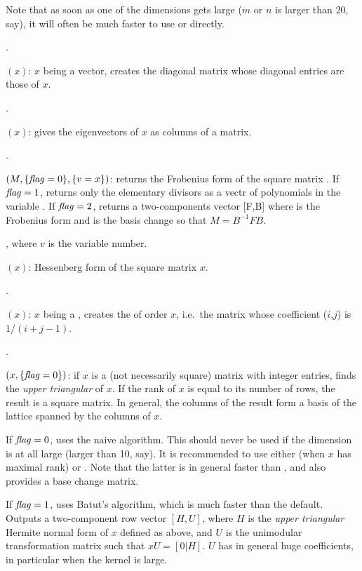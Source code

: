 Note that as soon as one of the dimensions gets large ($m$ or $n$ is larger
than 20, say), it will often be much faster to use  or
 directly.

.

$(x)$: $x$ being a vector, creates the diagonal matrix
whose diagonal entries are those of $x$.

.

$(x)$: gives the eigenvectors of $x$ as columns of a
matrix.

.

$(M,\{\hbox{\it f\kern0pt lag\/}=0\},\{v=x\})$: returns the Frobenius form of
the square matrix . If $\hbox{\it f\kern0pt lag\/}=1$, returns only the elementary divisors as
a vectr of polynomials in the variable .  If $\hbox{\it f\kern0pt lag\/}=2$, returns a
two-components vector [F,B] where  is the Frobenius form and  is
the basis change so that $M=B^{-1}FB$.

, where $v$ is the variable number.

$(x)$: Hessenberg form of the square matrix $x$.

.

$(x)$: $x$ being a , creates the
of order $x$, i.e.~the matrix whose coefficient
($i$,$j$) is $1/ (i+j-1)$.

.

$(x,\{\hbox{\it f\kern0pt lag\/}=0\})$: if $x$ is a (not necessarily square)
matrix with integer entries, finds the \emph{upper triangular}
 of $x$. If the rank of $x$ is equal to its number
of rows, the result is a square matrix. In general, the columns of the result
form a basis of the lattice spanned by the columns of $x$.

If $\hbox{\it f\kern0pt lag\/}=0$, uses the naive algorithm. This should never be used if the
dimension is at all large (larger than 10, say). It is recommended to use
either  (when $x$ has maximal rank) or
. Note that the latter is in general faster than
, and also provides a base change matrix.

If $\hbox{\it f\kern0pt lag\/}=1$, uses Batut's algorithm, which is much faster than the default.
Outputs a two-component row vector $[H,U]$, where $H$ is the \emph{upper
triangular} Hermite normal form of $x$ defined as above,  and $U$ is the
unimodular transformation matrix such that $xU=[0|H]$. $U$ has in general
huge coefficients, in particular when the kernel is large.

